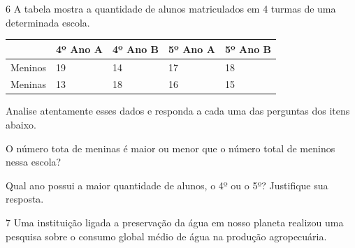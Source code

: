 
\num{6} A tabela mostra a quantidade de alunos matriculados em 4 turmas de
uma determinada escola.

\begin{longtable}[]{@{}lllll@{}}
\toprule
& 4º Ano A & 4º Ano B & 5º Ano A & 5º Ano B\tabularnewline
\midrule
\endhead
Meninos & 19 & 14 & 17 & 18\tabularnewline
Meninas & 13 & 18 & 16 & 15\tabularnewline
\bottomrule
\end{longtable}

Analise atentamente esses dados e responda a cada uma das perguntas dos
itens abaixo.

\begin{escolha}
\item
  O número tota de meninas é maior ou menor que o número total de
  meninos nessa escola?


\item
  Qual ano possui a maior quantidade de alunos, o 4º ou o 5º? Justifique
  sua resposta.

\end{escolha}


\num{7} Uma instituição ligada a preservação da água em nosso planeta
realizou uma pesquisa sobre o consumo global médio de água na produção
agropecuária.

